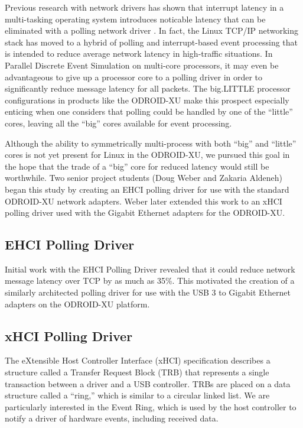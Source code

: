 \documentclass[11pt]{book}
\begin{document}
Previous research with network drivers has shown that interrupt latency in a multi-tasking
operating system introduces noticable latency that can be eliminated with a polling
network driver \cite{dovrolis-01,liu-09}.  In fact, the Linux TCP/IP networking stack has
moved to a hybrid of polling and interrupt-based event processing that is intended to
reduce average network latency in high-traffic situations.  In Parallel Discrete Event
Simulation on multi-core processors, it may even be advantageous to give up a processor
core to a polling driver in order to significantly reduce message latency for all packets.
The big.LITTLE processor configurations in products like the ODROID-XU make this prospect
especially enticing when one considers that polling could be handled by one of the
``little'' cores, leaving all the ``big'' cores available for event processing.

Although the ability to symmetrically multi-process with both ``big'' and ``little'' cores
is not yet present for Linux in the ODROID-XU, we pursued this goal in the hope that the
trade of a ``big'' core for reduced latency would still be worthwhile.  Two senior project
students (Doug Weber and Zakaria Aldeneh) began this study by creating an EHCI polling
driver for use with the standard ODROID-XU network adapters.  Weber later extended this
work to an xHCI polling driver used with the Gigabit Ethernet adapters for the ODROID-XU.

\subsection{EHCI Polling Driver}

Initial work with the EHCI Polling Driver revealed that it could reduce network message
latency over TCP by as much as 35\%.  This motivated the creation of a similarly
architected polling driver for use with the USB 3 to Gigabit Ethernet adapters on the
ODROID-XU platform.

\subsection{xHCI Polling Driver}

The eXtensible Host Controller Interface (xHCI) specification \cite{xhci} describes a
structure called a Transfer Request Block (TRB) that represents a single transaction
between a driver and a USB controller.  TRBs are placed on a data structure called a
``ring,'' which is similar to a circular linked list.  We are particularly interested in
the Event Ring, which is used by the host controller to notify a driver of hardware
events, including received data.
\end{document}
